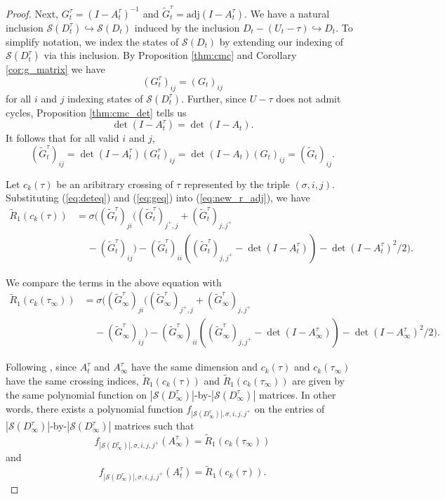 \documentclass[11pt,hyp,]{nyjm}
\numberwithin{thm}{section}
\theoremstyle{definition}
\theoremstyle{remark}
\begin{document}
\begin{proof}
		Next, $G^\tau_t = (I - A^\tau_t)^{-1}$ and $\widetilde{G}^\tau_t = \text{adj}(I - A^\tau_t)$. We have a natural inclusion $\mathcal{S}(D^\tau_t) \hookrightarrow \mathcal{S}(D_t)$ induced by the inclusion $D_t - (U_t - \tau) \hookrightarrow D_t$. To simplify notation, we index the states of $\mathcal{S}(D_t)$ by extending our indexing of $\mathcal{S}(D^\tau_t)$ via this inclusion. By Proposition \ref{thm:cmc} and Corollary \ref{cor:g_matrix} we have
		$$
		(G^\tau_t)_{ij} = (G_t)_{ij}
		$$
		for all $i$ and $j$ indexing states of $\mathcal{S}(D^\tau_t)$. Further, since $U - \tau$ does not admit cycles, Proposition \ref{thm:cmc_det} tells us
		\begin{equation}
			\label{eq:deteq}
			\det(I - A^\tau_t) = \det(I - A_t).
		\end{equation}
		It follows that for all valid $i$ and $j$,
		\begin{equation}
			\label{eq:geq}
			(\widetilde{G}^\tau_t)_{ij} = \det(I - A^\tau_t)(G^\tau_t)_{ij} = \det(I - A_t) (G_t)_{ij} = (\widetilde{G}_t)_{ij}.
		\end{equation}
	
		Let $c_k(\tau)$ be an aribitrary crossing of $\tau$ represented by the triple $(\sigma, i, j)$. Substituting (\ref{eq:deteq}) and (\ref{eq:geq}) into (\ref{eq:new_r_adj}), we have
		\begin{align}
			\label{eq:compare}
			\widetilde{R}_1(c_k(\tau)) &= \sigma((\widetilde{G}^\tau_t)_{ji}((\widetilde{G}^\tau_t)_{j^+, j} + (\widetilde{G}^\tau_t)_{j, j^+} \\
			& \ \ \ \ \ - (\widetilde{G}^\tau_t)_{ij}) - (\widetilde{G}^\tau_t)_{ii}((\widetilde{G}^\tau_t)_{j,j^+} - \det(I - A^\tau_t)) - \det(I - A^\tau_t)^2/2). \nonumber
		\end{align}
	
		We compare the terms in the above equation with 
		\begin{align*}
		\widetilde{R}_1(c_k(\tau_\infty)) &= \sigma((\widetilde{G}^\tau_\infty)_{ji}((\widetilde{G}^\tau_\infty)_{j^+, j} + (\widetilde{G}^\tau_\infty)_{j, j^+} \\
		& \ \ \ \ \ - (\widetilde{G}^\tau_\infty)_{ij}) - (\widetilde{G}^\tau_\infty)_{ii}((\widetilde{G}^\tau_\infty)_{j,j^+} - \det(I - A^\tau_\infty)) - \det(I - A^\tau_\infty)^2/2).
		\end{align*}
	
		Following , since $A^\tau_t$ and $A^\tau_\infty$ have the same dimension and $c_k(\tau)$ and $c_k(\tau_\infty)$ have the same crossing indices, $\widetilde{R}_1(c_k(\tau))$ and $\widetilde{R}_1(c_k(\tau_\infty))$ are given by the same polynomial function on $|\mathcal{S}(D^\tau_\infty)|$-by-$|\mathcal{S}(D^\tau_\infty)|$ matrices. In other words, there exists a polynomial function $f_{|\mathcal{S}(D^\tau_\infty)|, \sigma, i , j, j^+}$ on the entries of $|\mathcal{S}(D^\tau_\infty)|$-by-$|\mathcal{S}(D^\tau_\infty)|$ matrices such that
		$$
		f_{|\mathcal{S}(D^\tau_\infty)|, \sigma, i , j, j^+}(A^\tau_\infty) = \widetilde{R}_1(c_k(\tau_\infty))
		$$
		and
		$$
		f_{|\mathcal{S}(D^\tau_\infty)|, \sigma, i , j, j^+}(A^\tau_t) =  \widetilde{R}_1(c_k(\tau)).
		$$
		

\end{proof}
\end{document}
